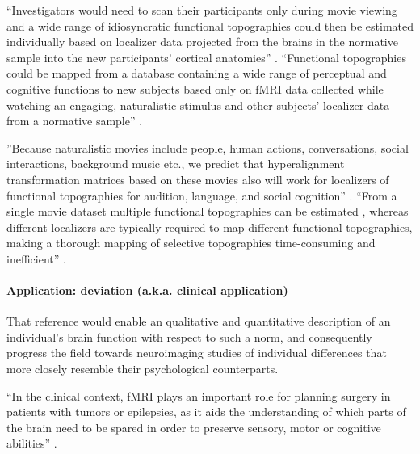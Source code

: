 %
``Investigators would need to scan their participants only during movie viewing
and a wide range of idiosyncratic functional topographies could then be
estimated individually based on localizer data projected from the brains in the
normative sample into the new participants' cortical anatomies''
\citep{jiahui2020predicting}.
%
``Functional topographies could be mapped from a database containing a wide
range of perceptual and cognitive functions to new subjects based only on fMRI
data collected while watching an engaging, naturalistic stimulus and other
subjects' localizer data from a normative sample'' \citep{jiahui2020predicting}.

%
''Because naturalistic movies include people, human actions, conversations,
social interactions, background music etc., we predict that hyperalignment
transformation matrices based on these movies also will work for localizers of
functional topographies for audition, language, and social cognition''
\citep{jiahui2020predicting}.
%
``From a single movie dataset multiple functional topographies can be estimated
\citep{guntupalli2016model}, whereas different localizers are typically required
to map different functional topographies, making a thorough mapping of selective
topographies time-consuming and inefficient'' \citep{jiahui2020predicting}.


\paragraph{Application: deviation (a.k.a. clinical application)}





%
That reference would enable an qualitative and quantitative description of an
individual's brain function with respect to such a norm, and consequently
progress the field towards neuroimaging studies of individual differences that
more closely resemble their psychological counterparts.


``In the clinical context, fMRI plays an important role for planning surgery in
patients with tumors or epilepsies, as it aids the understanding of which parts
of the brain need to be spared in order to preserve sensory, motor or cognitive
abilities'' \citep{wegrzyn2018thought}.


